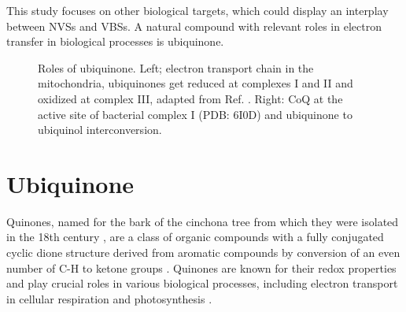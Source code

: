 This study focuses on other biological targets, which could display an interplay between NVSs and VBSs. A natural compound with relevant roles in electron transfer in biological processes is ubiquinone.\\

\begin{figure}[ht!]
  \centering
  \caption[Role of ubiquinone]{Roles of ubiquinone. Left; electron transport chain in the mitochondria, ubiquinones get reduced at complexes I and II and oxidized at complex III, adapted from Ref. . Right: CoQ at the active site of bacterial complex I (PDB: 6I0D) \cite{gutierrez2020key} and ubiquinone to ubiquinol interconversion.}
  \label{fig:ETC}
\end{figure}

\section{Ubiquinone}
Quinones, named for the bark of the cinchona tree from which they were isolated in the 18th century \cite{rusell1873quinone}, are a class of organic compounds with a fully conjugated cyclic dione structure derived from aromatic compounds by conversion of an even number of C-H to ketone groups \cite{IUPACQ050152025}. Quinones are known for their redox properties and play crucial roles in various biological processes, including electron transport in cellular respiration and photosynthesis \cite{ernster1995biochemical,chen2024low}.\\

